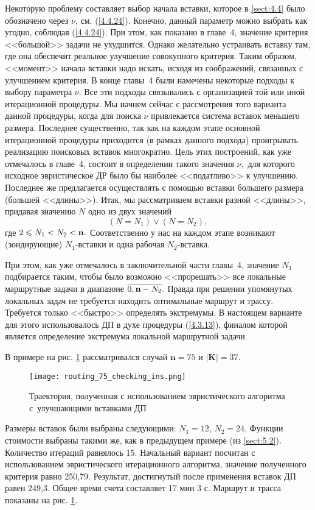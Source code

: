 Некоторую проблему составляет выбор начала вставки,
которое в \ref{sect:4.4}
было обозначено через $\nu$,
см. (\ref{4.4.24}).
Конечно, данный параметр можно выбрать как угодно,
соблюдая (\ref{4.4.24}).
При этом, как показано в
главе~4, значение критерия <<большой>> задачи не ухудшится.
Однако желательно устраивать вставку там,
где она обеспечит реальное улучшение совокупного критерия.
Таким образом, <<момент>> начала вставки надо искать,
исходя из соображений, связанных с улучшением критерия.
В конце главы~4 были намечены некоторые подходы к выбору параметра $\nu.$
Все эти подходы связывались с организацией той или иной итерационной процедуры.
Мы начнем сейчас с рассмотрения того варианта данной процедуры,
когда для поиска $\nu$
привлекается система вставок меньшего размера.
Последнее существенно,
так как на каждом этапе основной итерационной процедуры приходится
(в рамках данного подхода)
проигрывать реализацию поисковых вставок многократно.
Цель этих построений, как  уже отмечалось в главе~4,
состоит в определении такого значения $\nu,$
для которого исходное эвристическое ДР было бы
наиболее <<податливо>> к улучшению.
Последнее же предлагается осуществлять с помощью вставки большего размера
(большей <<длины>>).
Итак, мы рассматриваем вставки разной <<длины>>,
придавая значению $N$ одно из двух значений
$$
  (N = N_1) \vee (N=N_2)
  ,
$$
где $2 \leqslant N_1 < N_2 <{\mathbf n}.$
Соответственно у нас на каждом этапе возникают
(зондирующие)
$N_1$-вставки и одна рабочая $N_2$-вставка.

При этом, как уже отмечалось в заключительной части главы~4,
значение
$N_1$ подбирается таким,
чтобы было возможно <<прорешать>> все локальные маршрутные задачи в диапазоне
$\ov{0,\nn-N_2}.$
Правда при решении упомянутых
локальных задач не требуется находить оптимальные маршрут и трассу.
Требуется только <<быстро>> определять экстремумы.
В настоящем варианте для этого использовалось ДП в духе процедуры (\ref{4.3.13}),
финалом которой является определение экстремума локальной маршрутной задачи.

В примере
на рис. \ref{DP_Inserts_Result}
рассматривался случай
$\mathbf{n}=75$ и $|\mathbf{K}|=37$.

\begin{figure}[h]
  \begin{center}
  \texttt{[image: routing\_75\_checking\_ins.png]}
  \caption{
    Траектория, полученная с использованием эвристического алгоритма
    с~улучшающими вставками ДП
    }
  \label{DP_Inserts_Result}
  \end{center}
\end{figure}

Размеры вставок были выбраны следующими:
$N_1=12$, $N_2=24$.
Функции стоимости выбраны такими же, как в предыдущем примере
(из \ref{sect:5.2}).
Количество итераций равнялось 15.
Начальный вариант посчитан с использованием эвристического итерационного алгоритма,
значение полученного критерия равно 250,79.
Результат, достигнутый после применения вставок ДП равен 249,3.
Общее время счета составляет 17 мин 3 с.
Маршрут и трасса показаны
на рис. \ref{DP_Inserts_Result}.

